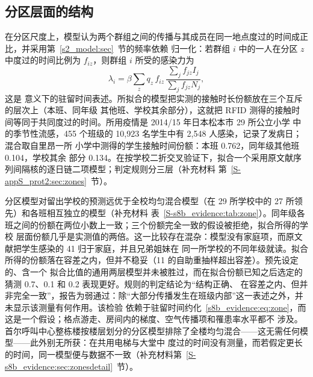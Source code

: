 \subsection{分区层面的结构}\label{s8b_evidence:sec:zones}

在分区尺度上，模型认为两个群组之间的传播与其成员在同一地点度过的时间成正比，并采用第~\ref{s2_model:sec}~节的频率依赖
归一化：若群组 $i$ 中的一人在分区 $z$ 中度过的时间比例为 $f_{iz}$，则群组 $i$ 所受的感染力为
\begin{equation}\label{s8b_evidence:eq:zone}
  \lambda_i=\beta\sum_z q_z\,f_{iz}\,\frac{\sum_jf_{jz}I_j}{\sum_jf_{jz}N_j},
\end{equation}
这是 \citet{bichara2015sis} 意义下的驻留时间表述。所拟合的模型把实测的接触时长份额放在三个互斥的层次上（本班、同年级
其他班、学校其余部分），这就把 RFID 测得的接触时间等同于共同度过的时间。所用疫情是 2014/15 年日本松本市 29 所公立小学
中的季节性流感，455 个班级的 10{,}923 名学生中有 2{,}548 人感染，记录了发病日\citep{endo2021within}；混合取自里昂一所
小学中测得的学生接触时间份额\citep{stehle2011high,gemmetto2014mitigation}：本班 0.762，同年级其他班 0.104，学校其余
部分 0.134。在按学校二折交叉验证下，拟合一个采用原文献序列间隔核的逐日链二项模型；判定规则分三层（补充材料
第~\ref{S-appS_prot2:sec:zones}~节）。

分区模型对留出学校的预测远优于全校均匀混合模型（在 29 所学校中的 27 所领先）和各班相互独立的模型（补充材料
表~\ref{S-s8b_evidence:tab:zone}）。同年级各班之间的份额在两位小数上一致；三个份额完全一致的假设被拒绝，拟合所得的学校
层面份额几乎是实测值的两倍。这一比较存在混杂：模型没有家庭项，而原文献把学生感染的 41\pct{} 归于家庭，并且兄弟姐妹在
同一所学校的不同年级就读。拟合所得的份额落在容差之内，但并不稳妥（11\pct{} 的自助重抽样超出容差）。预先设定的、含一个
拟合比值的通用两层模型并未被胜过，而在拟合份额已知之后选定的猜测 0.7、0.1 和 0.2 表现更好。规则的判定结论为“结构正确、
在容差之内、但并非完全一致”，报告为弱通过：除“大部分传播发生在班级内部”这一表述之外，并未显示该测量有何作用。该检验
依赖于驻留时间约化~\eqref{s8b_evidence:eq:zone}，而这是一个假设；格点游走、房间内的梯度、空气传播项和罹患率水平都不
涉及。首尔呼叫中心整栋楼按楼层划分的分区模型排除了全楼均匀混合——这无需任何模型——此外别无所获：在共用电梯与大堂中
度过的时间没有测量，而若假定更长的时间，同一模型便与数据不一致（补充材料第~\ref{S-s8b_evidence:sec:zonesdetail}~节）。

